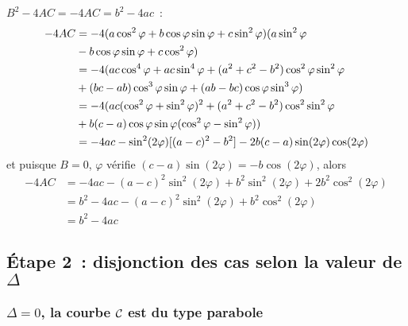 \(B^2-4AC = -4AC = b^2-4ac\)~:
\begin{align}
  -4AC& = -4(a\cos^2\varphi + b\cos\varphi\sin\varphi 
  +c\sin^2\varphi)(a\sin^2\varphi \\ 
      &- b\cos\varphi\sin\varphi + c\cos^2\varphi) \notag\\
      & = -4(ac\cos^4\varphi + ac\sin^4\varphi + (a^2 + 
      c^2 - b^2)\cos^2\varphi\sin^2\varphi\\
      & + (bc - ab)\cos^3\varphi\sin\varphi + (ab - bc)\cos\varphi\sin^3\varphi)
      \notag\\
      & = -4(ac(\cos^2\varphi + \sin^2\varphi)^2 + (a^2 + c^2 - 
      b^2)\cos^2\sin^2\varphi \\ 
      & + b(c-a)\cos\varphi\sin\varphi(\cos^2\varphi-\sin^2\varphi)) \notag\\
      & = -4ac - \sin^2(2\varphi)[(a - c)^2 - b^2] - 2b(c - 
      a)\sin(2\varphi)\cos(2\varphi)
\end{align}
et puisque \(B = 0\), \(\varphi\) vérifie 
\((c - a)\sin(2\varphi) = -b\cos(2\varphi)\), alors
\begin{align}
  -4AC& = -4ac - (a - c)^2\sin^2(2\varphi) + b^2\sin^2(2\varphi) + 2b^2\cos^2(2\varphi)\\
      & = b^2 - 4ac - (a - c)^2\sin^2(2\varphi) + b^2\cos^2(2\varphi)\\
      & = b^2 - 4ac
\end{align}

\subsection{Étape 2~: disjonction des cas selon la valeur de \(\Delta\)}

\subsubsection{\(\Delta = 0\), la courbe \(\mathcal{C}_{{}}\) est du type parabole}

